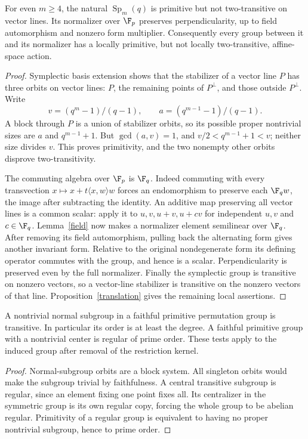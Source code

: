 \begin{proposition}\label{symplectic}
For even $m\ge4$, the natural $\operatorname{Sp}_m(q)$ is primitive but
not two-transitive on vector lines. Its normalizer over $\F_p$ preserves
perpendicularity, up to field automorphism and nonzero form multiplier.
Consequently every group between it and its normalizer has a locally
primitive, but not locally two-transitive, affine-space action.
\end{proposition}
\begin{proof}
Symplectic basis extension shows that the stabilizer of a vector line
$P$ has three orbits on vector lines: $P$, the remaining points of
$P^\perp$, and those outside $P^\perp$. Write
\[
 v=(q^m-1)/(q-1),\qquad a=(q^{m-1}-1)/(q-1).
\]
A block through $P$ is a union of stabilizer orbits, so its possible
proper nontrivial sizes are $a$ and $q^{m-1}+1$. But
$\gcd(a,v)=1$, and $v/2<q^{m-1}+1<v$; neither size divides $v$.
This proves primitivity, and the two nonempty other orbits disprove
two-transitivity.

The commuting algebra over $\F_p$ is $\F_q$. Indeed commuting with
every transvection $x\mapsto x+t\langle x,w\rangle w$ forces an
endomorphism to preserve each $\F_qw$, the image after subtracting the
identity. An additive map preserving all vector lines is a common scalar:
apply it to $u,v,u+v,u+cv$ for independent $u,v$ and $c\in\F_q$.
Lemma~\ref{field} now makes a normalizer element semilinear over $\F_q$.
After removing its field automorphism, pulling back the alternating form
gives another invariant form. Relative to the original nondegenerate
form its defining operator commutes with the group, and hence is a
scalar. Perpendicularity is preserved even by the full normalizer.
Finally the symplectic group is transitive on nonzero vectors, so a
vector-line stabilizer is transitive on the nonzero vectors of that
line. Proposition~\ref{translation} gives the remaining local assertions.
\end{proof}

\begin{lemma}\label{normaltest}
A nontrivial normal subgroup in a faithful primitive permutation group
is transitive. In particular its order is at least the degree.
A faithful primitive group with a nontrivial center is regular of prime
order. These tests apply to the induced group after removal of the
restriction kernel.
\end{lemma}
\begin{proof}
Normal-subgroup orbits are a block system. All singleton orbits would
make the subgroup trivial by faithfulness. A central transitive subgroup
is regular, since an element fixing one point fixes all. Its centralizer
in the symmetric group is its own regular copy, forcing the whole group
to be abelian regular. Primitivity of a regular group is equivalent to
having no proper nontrivial subgroup, hence to prime order.
\end{proof}

